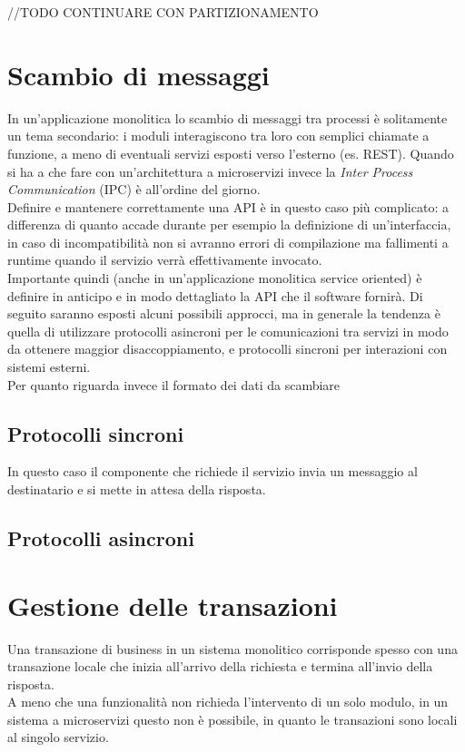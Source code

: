 //TODO CONTINUARE CON PARTIZIONAMENTO

\section{Scambio di messaggi}
In un'applicazione monolitica lo scambio di messaggi tra processi è solitamente un tema secondario: i moduli interagiscono tra loro con semplici chiamate a funzione, a meno di eventuali servizi esposti verso l'esterno (es. REST).
Quando si ha a che fare con un'architettura a microservizi invece la \textit{Inter Process Communication} (IPC) è all'ordine del giorno.\\
Definire e mantenere correttamente una API è in questo caso più complicato: a differenza di quanto accade durante per esempio la definizione di un'interfaccia, in caso di incompatibilità non si avranno errori di compilazione ma fallimenti a runtime quando il servizio verrà effettivamente invocato.\\
Importante quindi (anche in un'applicazione monolitica service oriented) è definire in anticipo e in modo dettagliato la API che il software fornirà.
Di seguito saranno esposti alcuni possibili approcci, ma in generale la tendenza è quella di utilizzare protocolli asincroni per le comunicazioni tra servizi in modo da ottenere maggior disaccoppiamento, e protocolli sincroni per interazioni con sistemi esterni.\\
Per quanto riguarda invece il formato dei dati da scambiare 

\subsection{Protocolli sincroni}
In questo caso il componente che richiede il servizio invia un messaggio al destinatario e si mette in attesa della risposta.

\subsection{Protocolli asincroni}



\section{Gestione delle transazioni}
Una transazione di business in un sistema monolitico corrisponde spesso con una transazione locale che inizia all'arrivo della richiesta e termina all'invio della risposta.\\
A meno che una funzionalità non richieda l'intervento di un solo modulo, in un sistema a microservizi questo non è possibile, in quanto le transazioni sono locali al singolo servizio.


